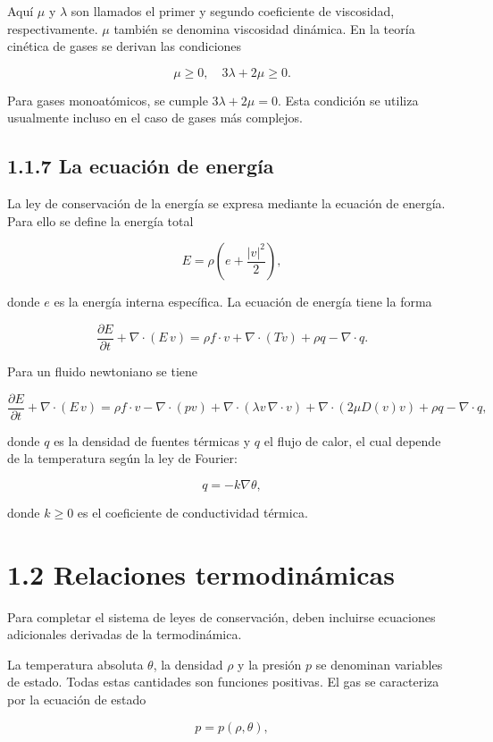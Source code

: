 \documentclass[12pt,a4paper]{article}
\begin{document}
Aquí $\mu$ y $\lambda$ son llamados el primer y segundo coeficiente de viscosidad, respectivamente. $\mu$ también se denomina viscosidad dinámica. En la teoría cinética de gases se derivan las condiciones

\[
\mu \geq 0, \quad 3\lambda + 2\mu \geq 0.
\]

Para gases monoatómicos, se cumple $3\lambda + 2\mu = 0$. Esta condición se utiliza usualmente incluso en el caso de gases más complejos.

\subsection*{1.1.7 La ecuación de energía}

La ley de conservación de la energía se expresa mediante la ecuación de energía. Para ello se define la energía total

\[
E = \rho\left(e + \frac{|v|^2}{2}\right),
\]

donde $e$ es la energía interna específica. La ecuación de energía tiene la forma

\[
\frac{\partial E}{\partial t} + \nabla \cdot (E \, v) = \rho f \cdot v + \nabla \cdot (T v) + \rho q - \nabla \cdot q.
\]

Para un fluido newtoniano se tiene

\[
\frac{\partial E}{\partial t} + \nabla \cdot (E \, v) = \rho f \cdot v - \nabla \cdot (p v) + \nabla \cdot (\lambda v \, \nabla \cdot v) + \nabla \cdot (2\mu D(v)v) + \rho q - \nabla \cdot q,
\]

donde $q$ es la densidad de fuentes térmicas y $q$ el flujo de calor, el cual depende de la temperatura según la ley de Fourier:

\[
q = -k \nabla \theta,
\]

donde $k \geq 0$ es el coeficiente de conductividad térmica.

\section*{1.2 Relaciones termodinámicas}

Para completar el sistema de leyes de conservación, deben incluirse ecuaciones adicionales derivadas de la termodinámica.

La temperatura absoluta $\theta$, la densidad $\rho$ y la presión $p$ se denominan variables de estado. Todas estas cantidades son funciones positivas. El gas se caracteriza por la ecuación de estado

\[
p = p(\rho, \theta),
\]
\end{document}
